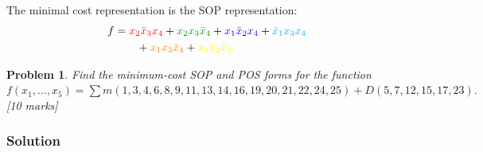 \documentclass{article}
\newtheorem{prob}{Problem}
\newcommand{\bx}{\bar{x}}
\newcommand{\cred}{\color{red}}
\newcommand{\cg}{\color{green!60!black}}
\newcommand{\cb}{\color{blue}}
\begin{document}
 The minimal cost representation is the SOP representation:
 \begin{align*}
   f &= { \cred x_2 \bx_3 x_4 } +  { \cg x_2 x_3 \bx_4} + {\cb x_1 \bx_2 x_4} +
       {\color{cyan} \bx_1 x_3 x_4 }
   \\
     &\qquad + {\color{orange} x_1 x_3 \bx_4} +
       {\color{yellow} x_1 x_2 \bx_3 }
 \end{align*}


\begin{prob}
  Find the minimum-cost SOP and POS forms for the function \\
  $f(x_1 , \dots, x_5) =
  \sum m(1, 3, 4, 6, 8, 9, 11, 13, 14, 16, 19, 20, 21, 22, 24, 25) + D(5, 7,
  12, 15, 17, 23).$  \cite[Prob 2.42]{brown2013fundamentals} [10 marks]
  \label{prob:prob10}
\end{prob}

\subsubsection*{Solution}
\end{document}
